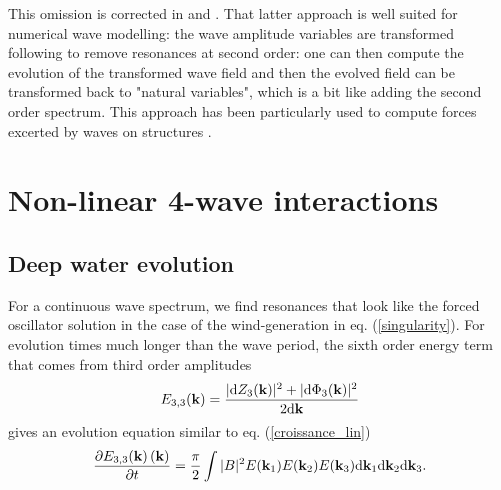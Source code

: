 This omission is corrected in \cite{Creamer&al.1989} and \cite{Janssen2009}. That latter approach is well suited for numerical wave modelling: the wave amplitude variables are transformed following  \cite{Krasitskii1994} to remove resonances at second order: one can then compute the evolution of the transformed wave field and then the evolved field can be transformed back to "natural variables", which is a bit like adding the second order spectrum.
This approach has been particularly used to compute forces excerted by waves on structures 
\citep{Prevosto&Forristall2002}. 


\section{Non-linear 4-wave interactions}
\subsection{Deep water evolution}
For a continuous wave spectrum, we find resonances that look like the forced oscillator solution in the case of the wind-generation in eq. (\ref{singularity}). 
For evolution times much longer than the wave period, the sixth order energy term that comes from third order amplitudes 
\begin{equation}
E_{3,3}(\mathbf{k})=\frac{|\mathrm{d} Z_3(\mathbf{k})|^2 + |\mathrm{d} \Phi_3(\mathbf{k})|^2}{2 \mathrm{d} \mathbf{k}}
\end{equation}
gives an evolution equation similar to eq. (\ref{croissance_lin})
\begin{equation}
\frac{\partial E_{3,3}(\mathbf{k}) \left(\mathbf{k} \right)}{\partial t} = \frac{\pi}{2}  \int |B|^2 E(\mathbf{k}_1) E (\mathbf{k}_2) 
E (\mathbf{k}_3){\mathrm d}\mathbf{k}_1{\mathrm d}\mathbf{k}_2{\mathrm d}\mathbf{k}_3.\label{E33}
\end{equation}

